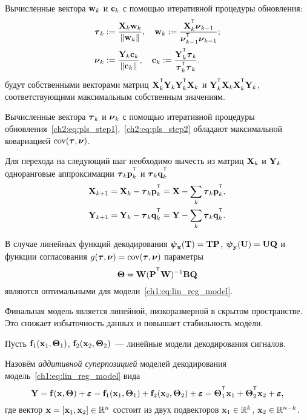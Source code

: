 \documentclass[11pt, a5paper]{dissert}
\begin{document}
\begin{statement}
	Вычисленные вектора $\mathbf{w}_k$ и $\mathbf{c}_k$ с помощью итеративной процедуры обновления:
	\begin{align}
		\btau_k &:= \frac{\bX_k \bw_k}{\|\bw_k\|}, \quad  \bw_k := \frac{\bX_k^{\T} \bnu_{k-1}}{\bnu_{k-1}^{\T} \bnu_{k-1}}; \label{ch2:eq:pls_step1}\\ 
		\bnu_k &:= \frac{\bY_k \bc_k}{\| \bc_k \|}, \quad \bc_k := \frac{\bY_k^{\T} \btau_k}{\btau_k^{\T} \btau_k}. \label{ch2:eq:pls_step2}
	\end{align}
	будут собственными векторами матриц $\bX_k^{\T} \bY_k \bY_k^{\T} \bX_k$ и $\bY_k^{\T} \bX_k \bX_k^{\T} \bY_k$, соответствующими максимальным собственным значениям.
\end{statement}

\begin{statement}
		Вычисленные вектора $\boldsymbol{\tau}_k$ и $\boldsymbol{\nu}_k$ с помощью итеративной процедуры обновления~\eqref{ch2:eq:pls_step1},~\eqref{ch2:eq:pls_step2} обладают максимальной ковариацией $\textnormal{cov}(\boldsymbol{\tau}, \boldsymbol{\nu})$.
\end{statement}

Для перехода на следующий шаг необходимо вычесть из матриц $\mathbf{X}_k$ и $\mathbf{Y}_k$ одноранговые аппроксимации $\btau_k \bp_k^{\T}$ и $\btau_k \bq_k^{\T}$
\begin{align*}
	\bX_{k + 1} &= \bX_{k} - \btau_k \bp_k^{\T} = \bX - \sum_k \btau_k \bp_k^{\T}, \\
	\bY_{k + 1} &= \bY_{k} - \btau_k \bq_k^{\T} = \bY - \sum_k \btau_k \bq_k^{\T}.
\end{align*}

\begin{theorem}
	В случае линейных функций декодирования $\boldsymbol{\psi}_{\mathbf{x}}(\mathbf{T}) = \mathbf{T} \mathbf{P}$, $\boldsymbol{\psi}_{\mathbf{y}} (\mathbf{U}) = \mathbf{U} \mathbf{Q}$ и функции согласования $g(\boldsymbol{\tau}, \boldsymbol{\nu}) = \textnormal{cov}(\boldsymbol{\tau}, \boldsymbol{\nu})$ параметры
	\[
		\bTheta = \bW (\bP^{\T} \bW)^{-1} \bB \bQ
	\]
	являются оптимальными для модели~\eqref{ch1:eq:lin_reg_model}.
\end{theorem}

Финальная модель является линейной, низкоразмерной в скрытом пространстве. 
Это снижает избыточность данных и повышает стабильность модели.

Пусть $\mathbf{f}_1(\mathbf{x}_1, \boldsymbol{\Theta}_1)$, $\mathbf{f}_2(\mathbf{x}_2, \boldsymbol{\Theta}_2)$~--- линейные модели декодирования сигналов. 
\begin{definition}
	Назовём \textit{аддитивной суперпозицией} моделей декодирования модель~\eqref{ch1:eq:lin_reg_model} вида
	\begin{equation}
		\bY = \mathbf{f}(\bx, \bTheta) + \bepsilon = \mathbf{f}_1(\bx_1, \bTheta_1) + \mathbf{f}_2(\bx_2, \bTheta_2) + \bepsilon = \bTheta_1^{\T} \bx_1 + \bTheta_2^{\T} \bx_2 + \bepsilon,
		\label{ch2:eq:two_modal_reg_model}
	\end{equation}
	где вектор $\mathbf{x} = [\mathbf{x}_1, \mathbf{x}_2] \in \mathbb{R}^n$ состоит из двух подвекторов $\mathbf{x}_1 \in \mathbb{R}^k$, $\mathbf{x}_2 \in \mathbb{R}^{n - k}$. 
\end{definition}
\end{document}
